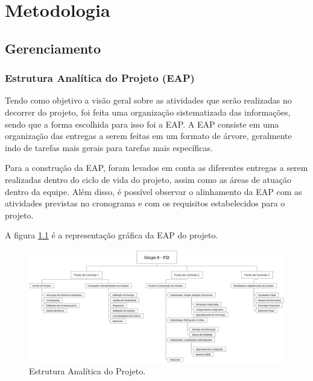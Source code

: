 \chapter{Metodologia}
  \section{Gerenciamento}
    \subsection{Estrutura Analítica do Projeto (EAP)}

      Tendo como objetivo a visão geral sobre as atividades que serão
      realizadas no decorrer do projeto, foi feita uma organização
      sistematizada das informações, sendo que a forma escolhida para
      isso foi a EAP. A EAP consiste em uma organização das entregas
      a serem feitas em um formato de árvore, geralmente indo de tarefas
      mais gerais para tarefas mais específicas.

      Para a construção da EAP, foram levados em conta as diferentes
      entregas a serem realizadas dentro do ciclo de vida do projeto,
      assim como as áreas de atuação dentro da equipe. Além disso, é
      possível observar o alinhamento da EAP com as atividades previstas
      no cronograma e com os requisitos estabelecidos para o projeto.

      A figura \ref{fig:eap} é a representação gráfica da EAP do projeto.

      \begin{figure}[!htbp]
      \begin{center}
      \includegraphics[width=\textwidth]{figuras/EAP.eps}
      \caption{\label{fig:eap}Estrutura Analítica do Projeto.}
      \end{center}
      \end{figure}

      \vfill
      \pagebreak


